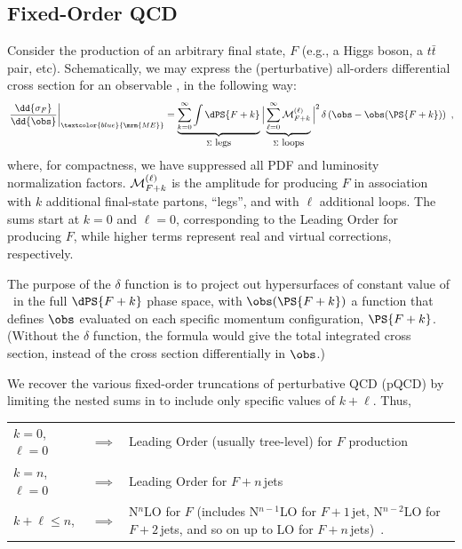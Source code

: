 \subsection{Fixed-Order QCD \label{sec:fixed-order}}
%

Consider the production of an arbitrary final state, $F$ (e.g., a
Higgs boson, a $t\bar{t}$ pair, etc). 
Schematically, we may  express the (perturbative) all-orders
differential cross section for an observable \obs, 
in the following way:
\begin{equation}
\left.\frac{\dd{\sigma_F}}{\dd{\obs}}\right\vert_{\textcolor{blue}{\mrm{ME}}}
= \underbrace{\sum_{k=0}^\infty\int \dPS{F+k} }_{\Sigma~\mbox{legs}} 
 \Big\vert \underbrace{\sum_{\ell=0}^{\infty} {\cal
   M}_{F+k}^{(\ell)}}_{\Sigma~\mbox{loops}} \Big\vert^2 \,
\delta\left(\obs-\obs(\PS{F+k})\right)~,\label{eq:fixed-order}
\end{equation}
where, for compactness, we have suppressed all PDF and luminosity
normalization factors. 
${\cal M}_{F+k}^{(\ell)}$ is the amplitude for producing $F$ in
association with $k$ additional final-state partons, ``legs'', 
and with $\ell$ additional loops. The sums start at $k=0$ and $\ell=0$,
corresponding to the Leading Order for producing $F$, while higher terms
represent real and virtual corrections, respectively. 

The purpose of the $\delta$ function is
to project out hypersurfaces of constant value of \obs\ 
in the full $\dPS{F+k}$ phase space, with $\obs(\PS{F+k})$ a function that
defines $\obs$ evaluated on each specific momentum configuration, 
$\PS{F+k}$. (Without the 
$\delta$ function, the formula would give the total integrated
cross section, instead of the cross section differentially in $\obs$.) 

We recover the various fixed-order truncations of perturbative QCD
\index{pQCD} (pQCD) 
by limiting the
nested sums in  to include only specific values
of $k+\ell$. Thus, 
%
%
%
\begin{center}
\begin{tabular}{lcp{9.5cm}}
$k=0$, $\ell=0$ &$\implies$& Leading Order  (usually tree-level) 
for $F$ production\\[2mm]
$k=n$, $\ell=0$ &$\implies$& Leading Order for $F+n\,$jets\\[2mm]
$k+\ell\le n$,  &$\implies$& N$^n$LO for $F$ {\small (includes N$^{n-1}$LO for
  $F+1\,$jet, N$^{n-2}$LO for $F+2\,$jets, and so on up to LO for $F+n\,$jets)}~.\\
\end{tabular}
\end{center}

